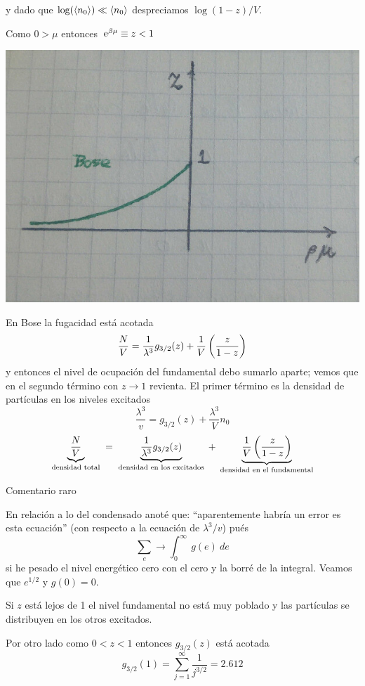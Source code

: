 \documentclass[10pt,oneside]{CBFT_book}
\begin{document}
y dado que $ \log (\braket{n_0}) \ll \braket{n_0} $ despreciamos $ \log (1-z) / V $.

Como $ 0 > \mu $ entonces $ \:\mathrm{e}^{\beta \mu} \equiv z < 1 $

\includegraphics[scale=0.5]{images/1625624640.jpg}

En Bose la fugacidad está acotada
\[
	\frac{N}{V} = \frac{1}{\lambda^3} g_{3/2}(z) + \frac{1}{V}\left( \frac{ z }{ 1-z } \right)
\]
y entonces el nivel de ocupación del fundamental debo sumarlo aparte; vemos que en el
segundo término con $z\to 1$ revienta.
El primer término es la densidad de partículas en los niveles excitados
\[
	\frac{\lambda^3}{v} =  g_{3/2}(z) + \frac{\lambda^3}{V} n_0
\]
\[
	\underbrace{\frac{N}{V}}_{\text{ densidad total }} =
	\underbrace{\frac{1}{\lambda^3} g_{3/2}(z)}_{\text{ densidad en los excitados }} +
	\underbrace{\frac{1}{V}\left( \frac{ z }{ 1-z } \right)}_{\text{ densidad en el fundamental }}
\]

\begin{ejemplo}{Comentario raro}

En relación a lo del condensado anoté que: ``aparentemente habría un error es esta ecuación''
(con respecto a la ecuación de $\lambda^3/v$) pués
\[
	 \sum_e \longrightarrow \int_0^\infty \: g(e) \: de
\]
si he pesado el nivel energético  cero con el cero y la borré de la integral. Veamos que $e^{1/2}$
y $g(0)=0$.
 
\end{ejemplo}

Si $z$ está lejos de 1 el nivel fundamental no está muy poblado y las partículas se distribuyen
en los otros excitados.

Por otro lado como $ 0 < z < 1 $ entonces $ g_{3/2}(z) $ está acotada 
\[
	g_{3/2}(1) = \sum_{j=1}^\infty \frac{1}{j^{3/2}} = 2.612
\]
\end{document}
